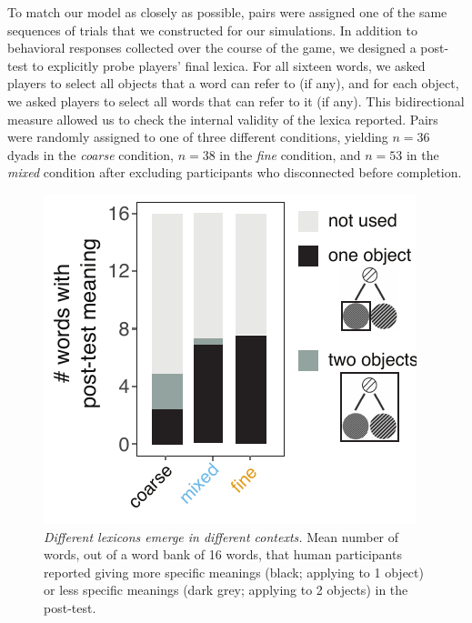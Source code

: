 To match our model as closely as possible, pairs were assigned one of the same sequences of trials that we constructed for our simulations. 
In addition to behavioral responses collected over the course of the game, we designed a post-test to explicitly probe players' final lexica. For all sixteen words, we asked players to select all objects that a word can refer to (if any), and for each object, we asked players to select all words that can refer to it (if any). 
This bidirectional measure allowed us to check the internal validity of the lexica reported.
Pairs were randomly assigned to one of three different conditions, yielding $n=36$ dyads in the \emph{coarse} condition, $n=38$ in the \emph{fine} condition, and $n=53$ in the \emph{mixed} condition after excluding participants who disconnected before completion.


\begin{figure}[t]
\begin{center}
\includegraphics[scale=1]{./figures/Exp2_postTest}
\caption{\emph{Different lexicons emerge in different contexts.} Mean number of words, out of a word bank of 16 words, that human participants reported giving more specific meanings (black; applying to 1 object) or less specific meanings (dark grey; applying to 2 objects) in the post-test.}
\label{fig:sec2postTest}
\end{center}
\end{figure}


